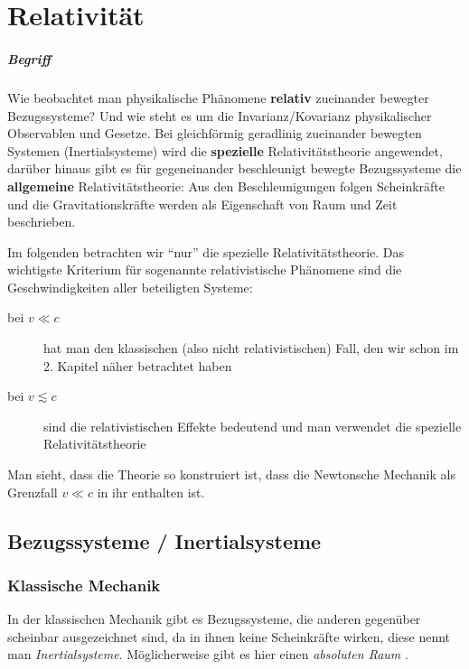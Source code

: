 \documentclass[oneside]{book}
\theoremstyle{definition}
\newcommand{\conseq}{$\rightarrow$~}
\begin{document}
\chapter{Relativität}

\paragraph{Begriff} Wie beobachtet man physikalische Phänomene \textbf{relativ} zueinander bewegter Bezugssysteme? Und wie steht es um die Invarianz/Kovarianz physikalischer Observablen und Gesetze.
Bei gleichförmig geradlinig zueinander bewegten Systemen (Inertialsysteme) wird die \textbf{spezielle} Relativitätstheorie angewendet, darüber hinaus gibt es für gegeneinander beschleunigt bewegte Bezugssysteme die \textbf{allgemeine} Relativitätstheorie: Aus den Beschleunigungen folgen Scheinkräfte und die Gravitationskräfte werden als Eigenschaft von Raum und Zeit beschrieben.

Im folgenden betrachten wir "`nur"' die spezielle Relativitätstheorie.
Das wichtigste Kriterium für sogenannte relativistische Phänomene sind die Geschwindigkeiten aller beteiligten Systeme:
\begin{description}
	\item[bei $v \ll c$] hat man den klassischen (also nicht relativistischen) Fall, den wir schon im 2. Kapitel näher betrachtet haben
	\item[bei $v \lesssim c $] sind die relativistischen Effekte bedeutend und man verwendet die spezielle Relativitätstheorie
\end{description}
Man sieht, dass die Theorie so konstruiert ist, dass die Newtonsche Mechanik als Grenzfall $v \ll c$ in ihr enthalten ist.

\section{Bezugssysteme / Inertialsysteme}
\subsection{Klassische Mechanik}
In der klassischen Mechanik gibt es Bezugssysteme, die anderen gegenüber scheinbar ausgezeichnet sind, da in ihnen keine Scheinkräfte wirken, diese nennt man \textit{Inertialsysteme}. Möglicherweise gibt es hier einen \textit{absoluten Raum} .
\end{document}

